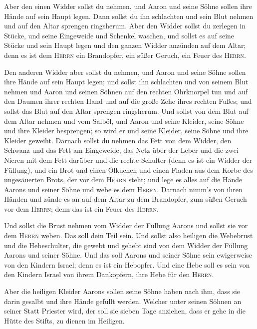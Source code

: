  Aber den einen Widder sollst du nehmen, und Aaron und
seine Söhne sollen ihre Hände auf sein Haupt legen.  Dann
sollst du ihn schlachten und sein Blut nehmen und auf den Altar sprengen
ringsherum.  Aber den Widder sollst du zerlegen in
Stücke, und seine Eingeweide und Schenkel waschen, und sollst es auf
seine Stücke und sein Haupt legen  und den ganzen Widder
anzünden auf dem Altar; denn es ist dem \textsc{Herrn} ein Brandopfer,
ein süßer Geruch, ein Feuer des \textsc{Herrn}.

 Den anderen Widder aber sollst du nehmen, und Aaron und
seine Söhne sollen ihre Hände auf sein Haupt legen;  und
sollst ihn schlachten und von seinem Blut nehmen und Aaron und seinen
Söhnen auf den rechten Ohrknorpel tun und auf den Daumen ihrer rechten
Hand und auf die große Zehe ihres rechten Fußes; und sollst das Blut auf
den Altar sprengen ringsherum.  Und sollst von dem Blut
auf dem Altar nehmen und vom Salböl, und Aaron und seine Kleider, seine
Söhne und ihre Kleider besprengen; so wird er und seine Kleider, seine
Söhne und ihre Kleider geweiht.  Darnach sollst du nehmen
das Fett von dem Widder, den Schwanz und das Fett am Eingeweide, das
Netz über der Leber und die zwei Nieren mit dem Fett darüber und die
rechte Schulter (denn es ist ein Widder der Füllung), 
und ein Brot und einen Ölkuchen und einen Fladen aus dem Korbe des
ungesäuerten Brots, der vor dem \textsc{Herrn} steht; 
und lege es alles auf die Hände Aarons und seiner Söhne und webe es dem
\textsc{Herrn}.  Darnach nimm's von ihren Händen und
zünde es an auf dem Altar zu dem Brandopfer, zum süßen Geruch vor dem
\textsc{Herrn}; denn das ist ein Feuer des \textsc{Herrn}.

 Und sollst die Brust nehmen vom Widder der Füllung
Aarons und sollst sie vor dem \textsc{Herrn} weben. Das soll dein Teil
sein.  Und sollst also heiligen die Webebrust und die
Hebeschulter, die gewebt und gehebt sind von dem Widder der Füllung
Aarons und seiner Söhne.  Und das soll Aarons und seiner
Söhne sein ewigerweise von den Kindern Israel; denn es ist ein Hebopfer.
Und eine Hebe soll es sein von den Kindern Israel von ihrem Dankopfern,
ihre Hebe für den \textsc{Herrn}.

 Aber die heiligen Kleider Aarons sollen seine Söhne
haben nach ihm, dass sie darin gesalbt und ihre Hände gefüllt werden.
 Welcher unter seinen Söhnen an seiner Statt Priester
wird, der soll sie sieben Tage anziehen, dass er gehe in die Hütte des
Stifts, zu dienen im Heiligen.

